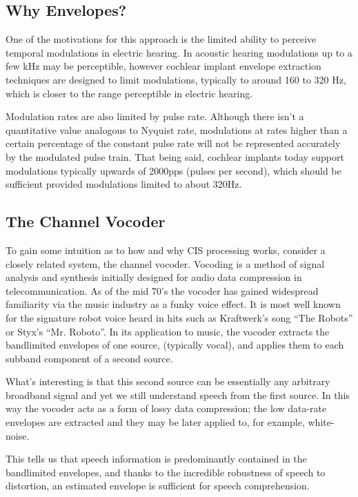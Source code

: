 \documentclass [11pt, proquest,oneside] {ganter_thesis}[2015/03/03]
\begin{document}

\subsection{Why Envelopes?}

One of the motivations for this approach is the limited ability to perceive temporal modulations in electric hearing.  In acoustic hearing modulations up to a few kHz may be perceptible, however cochlear implant envelope extraction techniques are designed to limit modulations, typically to around 160 to 320 Hz, which is closer to the range perceptible in electric hearing.

Modulation rates are also limited by pulse rate.  Although there isn't a quantitative value analogous to Nyquist rate, modulations at rates higher than a certain percentage of the constant pulse rate will not be represented accurately by the modulated pulse train.  That being said, cochlear implants today support modulations typically upwards of 2000pps (pulses per second), which should be sufficient provided modulations limited to about 320Hz.

\subsection{The Channel Vocoder}

To gain some intuition as to how and why CIS processing works, consider a closely related system, the channel vocoder.  Vocoding is a method of signal analysis and synthesis initially designed for audio data compression in telecommunication.  As of the mid 70's the vocoder has gained widespread familiarity via the music industry as a funky voice effect.  It is most well known for the signature robot voice heard in hits such as Kraftwerk's song ``The Robots'' or Styx's ``Mr. Roboto''.  In its application to music, the vocoder extracts the bandlimited envelopes of one source, (typically vocal), and applies them to each subband component of a second source.

What's interesting is that this second source can be essentially any arbitrary broadband signal and yet we still understand speech from the first source.  In this way the vocoder acts as a form of lossy data compression; the low data-rate envelopes are extracted and they may be later applied to, for example, white-noise.

This tells us that speech information is predominantly contained in the bandlimited envelopes, and thanks to the incredible robustness of speech to distortion, an estimated envelope is sufficient for speech comprehension.
\end{document}
